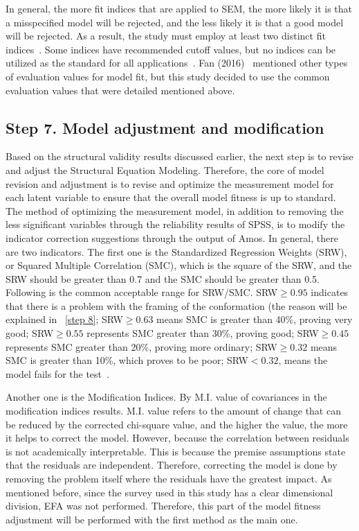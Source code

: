 In general, the more fit indices that are applied to SEM, the more likely it is that a misspecified model will be rejected, and the less likely it is that a good model will be rejected. As a result, the study must employ at least two distinct fit indices~\cite{ref17}. Some indices have recommended cutoff values, but no indices can be utilized as the standard for all applications~\cite{ref18,ref19,ref20,ref21}. Fan (2016)~\cite{ref16} mentioned other types of evaluation values for model fit, but this study decided to use the common evaluation values that were detailed mentioned above. 

\subsection{Step 7. Model adjustment and modification}
\label{s7}
Based on the structural validity results discussed earlier, the next step is to revise and adjust the Structural Equation Modeling. Therefore, the core of model revision and adjustment is to revise and optimize the measurement model for each latent variable to ensure that the overall model fitness is up to standard. The method of optimizing the measurement model, in addition to removing the less significant variables through the reliability results of SPSS, is to modify the indicator correction suggestions through the output of Amos. In general, there are two indicators. The first one is the Standardized Regression Weights (SRW), or Squared Multiple Correlation (SMC), which is the square of the SRW, and the SRW should be greater than 0.7 and the SMC should be greater than 0.5. Following is the common acceptable range for SRW/SMC. SRW$ \geq 0.95$ indicates that there is a problem with the framing of the conformation (the reason will be explained in ~\ref{step 8}; SRW$ \geq 0.63$ means SMC is greater than 40\%, proving very good; SRW$\geq0.55$ represents SMC greater than 30\%, proving good; SRW$ \geq0.45$ represents SMC greater than 20\%, proving more ordinary; SRW$\geq0.32$ means SMC is greater than 10\%, which proves to be poor; SRW$< 0.32$, means the model fails for the test~\cite{ref15,ref27}. 

Another one is the Modification Indices. By M.I. value of covariances in the modification indices results. M.I. value refers to the amount of change that can be reduced by the corrected chi-square value, and the higher the value, the more it helps to correct the model. However, because the correlation between residuals is not academically interpretable. This is because the premise assumptions state that the residuals are independent. Therefore, correcting the model is done by removing the problem itself where the residuals have the greatest impact. As mentioned before, since the survey used in this study has a clear dimensional division, EFA was not performed. Therefore, this part of the model fitness adjustment will be performed with the first method as the main one.


